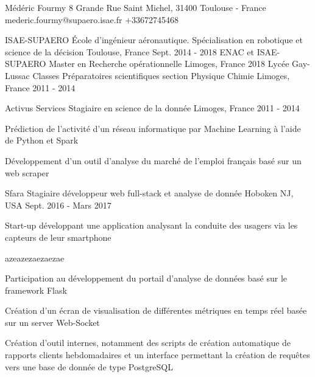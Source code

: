 \documentclass[11pt, a4paper, final]{resume}
\begin{document}
	\header
		{Médéric}
		{Fourmy}
		{8 Grande Rue Saint Michel, 31400 Toulouse - France}
		{mederic.fourmy@supaero.isae.fr}
		{+33672745468}


	\begin{cventries}
		\cventry
		{ISAE-SUPAERO}
		{École d'ingénieur aéronautique. Spécialisation en robotique et science de la décision}
		{Toulouse, France}
		{Sept. 2014 - 2018}
		{}
		\cventry
		{ENAC et ISAE-SUPAERO}
		{Master en Recherche opérationnelle}
		{Limoges, France}
		{2018}
		{}
		\cventry
		{Lycée Gay-Lussac}
		{Classes Préparatoires scientifiques section Physique Chimie}
		{Limoges, France}
		{2011 - 2014}
		{}
	\end{cventries}

	\cvsection{Expérience professionnelle}
	\begin{cventries}
		\cventry
		{Activus Services}
		{Stagiaire en science de la donnée}
		{Limoges, France}
		{2011 - 2014}
		{
			\begin{cvitems}{}
				\item Prédiction de l'activité d'un réseau informatique par Machine Learning à l'aide de Python et Spark
				\item Développement d'un outil d'analyse du marché de l'emploi français basé sur un web scraper
			\end{cvitems}
		}
		\cventry
		{Sfara}
		{Stagiaire développeur web full-stack et analyse de donnée}
		{Hoboken NJ, USA}
		{Sept. 2016 - Mars 2017}
		{
			Start-up développant une application analysant la conduite des usagers via les capteurs de leur smartphone
			\begin{cvitems}{azeazezaezaezae}
				\item Participation au développement du portail d'analyse de données basé sur le framework Flask
				\item Création d'un écran de visualisation de différentes métriques en temps réel basée sur un server Web-Socket
				\item Création d'outil internes, notamment des scripts de création automatique de rapports clients hebdomadaires et un interface permettant la création de requêtes vers une base de donnée de type PostgreSQL
			\end{cvitems}
		}
	\end{cventries}
\end{document}
